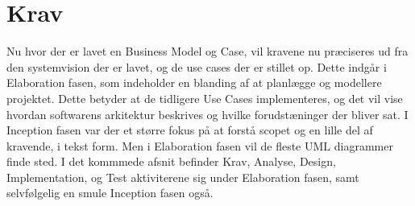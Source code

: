 \chapter{Krav}\label{ch:krav}
Nu hvor der er lavet en Business Model og Case, vil kravene nu præciseres ud fra den systemvision der er lavet, og de use cases der er stillet op. Dette indgår i Elaboration fasen, som indeholder en blanding af at planlægge og modellere projektet. Dette betyder at de tidligere Use Cases implementeres, og det vil vise hvordan softwarens arkitektur beskrives og hvilke forudstæninger der bliver sat. I Inception fasen var der et større fokus på at forstå scopet og en lille del af kravende, i tekst form. Men i Elaboration fasen vil de fleste UML diagrammer finde sted\cite{Larman2004}. I det kommmede afsnit befinder Krav, Analyse, Design, Implementation, og Test aktiviterene sig under Elaboration fasen, samt selvfølgelig en smule Inception fasen også. 



 